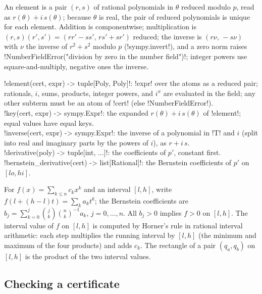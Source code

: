 An element is a pair $(r,s)$ of rational polynomials in $\theta$ reduced modulo $p$, read as $r(\theta)+i\,s(\theta)$; because $\theta$ is real, the pair of reduced polynomials is unique for each element. Addition is componentwise; multiplication is $(r,s)(r',s')=(rr'-ss',\,rs'+sr')$ reduced; the inverse is $(r\nu,\,-s\nu)$ with $\nu$ the inverse of $r^2+s^2$ modulo $p$ (\py!sympy.invert!), and a zero norm raises \py!NumberFieldError("division by zero in the number field")!; integer powers use square-and-multiply, negative ones the inverse.

\begin{signature}
\py!element(cert, expr) -> tuple[Poly, Poly]!: \code!expr! over the atoms as a reduced pair; rationals, $i$, sums, products, integer powers, and $i^x$ are evaluated in the field; any other subterm must be an atom of \code!cert! (else \py!NumberFieldError!).\\
\py!key(cert, expr) -> sympy.Expr!: the expanded $r(\theta)+i\,s(\theta)$ of \py!element!; equal values have equal keys.\\
\py!inverse(cert, expr) -> sympy.Expr!: the inverse of a polynomial in \py!T! and $i$ (split into real and imaginary parts by the powers of $i$), as $r+i\,s$.\\
\py!derivative(poly) -> tuple[int, ...]!: the coefficients of $p'$, constant first.\\
\py!bernstein_derivative(cert) -> list[Rational]!: the Bernstein coefficients of $p'$ on $[\mathit{lo},\mathit{hi}]$.
\end{signature}

\begin{definition}\label{def:algebra-bernstein}
For $f(x)=\sum_{k\le n}c_kx^k$ and an interval $[l,h]$, write $f(l+(h-l)t)=\sum_k a_kt^k$; the Bernstein coefficients are $b_j=\sum_{k=0}^{j}\binom{j}{k}\binom{n}{k}^{-1}a_k$, $j=0,\ldots,n$. All $b_j>0$ implies $f>0$ on $[l,h]$. The interval value of $f$ on $[l,h]$ is computed by Horner's rule in rational interval arithmetic: each step multiplies the running interval by $[l,h]$ (the minimum and maximum of the four products) and adds $c_k$. The rectangle of a pair $(q_a,q_b)$ on $[l,h]$ is the product of the two interval values.
\end{definition}

\subsection{Checking a certificate}

